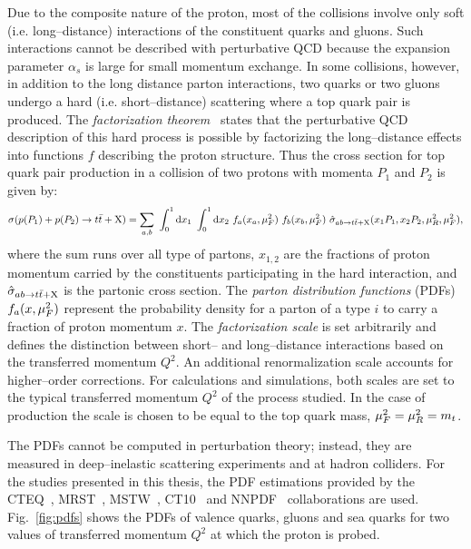Due to the composite nature of the proton, most of the
collisions involve only soft (i.e. long--distance) interactions of the
constituent quarks and gluons. Such interactions cannot be described
with perturbative QCD because the expansion parameter $\alpha_s$ is
large for small momentum exchange.
In some collisions, however, in addition to the long distance parton
interactions, two quarks or two gluons undergo a hard
(i.e. short--distance) scattering where a top quark pair is produced.
The {\it factorization theorem}~\cite{factorprinciple} states that
the perturbative QCD description of this hard process is possible by
factorizing the long--distance effects into functions $f$ describing the
proton structure. Thus the cross section for top quark pair
production in a collision of two protons with momenta $P_1$ and $P_2$
is given by:
\small{
\begin{equation}
  \sigma(p(P_1)+p(P_2)\to t\bar{t}{}+{\rm X})
  = 
  \sum_{a,b}
  ~\int_0^1{\rm d}x_1
  ~\int_0^1{\rm d}x_2
  ~ f_a(x_a,\mu_F^2{})~f_b(x_b,\mu_F^2)
  ~\hat{\sigma}_{ab\to t\bar{t}{}+\rm{X}}(x_1P_1,x_2P_2,\mu_R^2{},\mu_F^2{}),
  \label{eq:ttbarxs}
\end{equation}
}
where the sum runs over all type of partons, $x_{1,2}$ are the
fractions of proton momentum carried by the constituents participating
in the hard interaction, and $\hat{\sigma}_{ab\to t\bar{t}{}+\rm{X}}$ is
  the partonic cross section. 
The {\it parton distribution functions} (PDFs) $f_a(x,\mu_F^2{})$
represent the probability density for a parton of a type $i$ to carry
a fraction of proton momentum $x$. The {\it factorization scale}
\factscale{} is set arbitrarily and defines the distinction between
short-- and long--distance interactions based on the transferred
momentum $Q^2$. An additional renormalization scale \renormscale{}
accounts for higher--order corrections. For calculations and
simulations, both scales are set to the typical transferred momentum $Q^2$
of the process studied. In the case of \ttbar{} production the scale
is chosen to be equal to the top quark mass,
$\mu_F^2{}=\mu_R^2{}=m_t$.
  
The PDFs cannot be computed in perturbation theory; instead, they are
measured in deep--inelastic scattering experiments and at hadron colliders.
For the studies presented in this thesis, the PDF estimations
provided by the CTEQ~\cite{cteq6}, MRST~\cite{mrst}, MSTW~\cite{mstw},
CT10~\cite{ct10} and NNPDF~\cite{nnpdf} collaborations are
used. Fig.~\ref{fig:pdfs} shows the PDFs of valence quarks, gluons and
sea quarks for two values of transferred momentum $Q^2$ at which the
proton is probed. 

